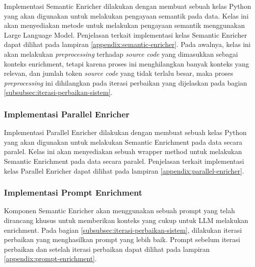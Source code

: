 Implementasi Semantic Enricher dilakukan dengan membuat sebuah kelas Python yang akan digunakan untuk melakukan pengayaan semantik pada data. Kelas ini akan menyediakan metode untuk melakukan pengayaan semantik menggunakan Large Language Model. Penjelasan terkait implementasi kelas Semantic Enricher dapat dilihat pada lampiran \ref{appendix:semantic-enricher}. Pada awalnya, kelas ini akan melakukan \textit{preprocessing} terhadap \textit{source code} yang dimasukkan sebagai konteks enrichment, tetapi karena proses ini menghilangkan banyak konteks yang relevan, dan jumlah token \textit{source code} yang tidak terlalu besar, maka proses \textit{preprocessing} ini dihilangkan pada iterasi perbaikan yang dijelaskan pada bagian \ref{subsubsec:iterasi-perbaikan-sistem}. 

\subsubsection{Implementasi Parallel Enricher}

Implementasi Parallel Enricher dilakukan dengan membuat sebuah kelas Python yang akan digunakan untuk melakukan Semantic Enrichment pada data secara paralel. Kelas ini akan menyediakan sebuah wrapper method untuk melakukan Semantic Enrichment pada data secara paralel. Penjelasan terkait implementasi kelas Parallel Enricher dapat dilihat pada lampiran \ref{appendix:parallel-enricher}.

\subsubsection{Implementasi Prompt Enrichment}

Komponen Semantic Enricher akan menggunakan sebuah prompt yang telah dirancang khusus untuk memberikan konteks yang cukup untuk LLM melakukan enrichment. Pada bagian \ref{subsubsec:iterasi-perbaikan-sistem}, dilakukan iterasi perbaikan yang menghasilkan prompt yang lebih baik. Prompt sebelum iterasi perbaikan dan setelah iterasi perbaikan dapat dilihat pada lampiran \ref{appendix:prompt-enrichment}.



